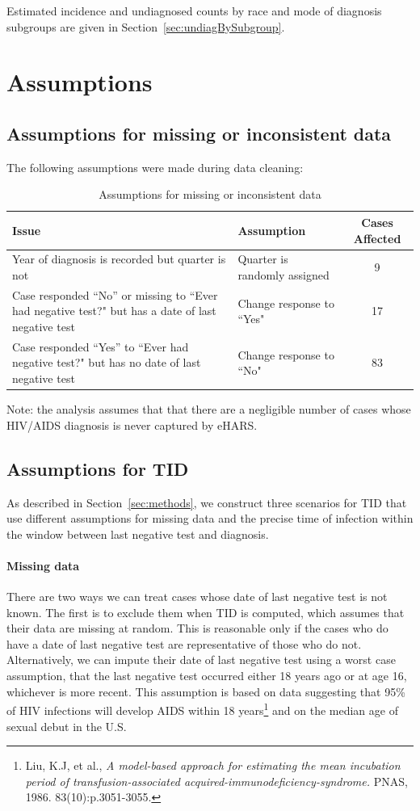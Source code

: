 \documentclass{article}\usepackage[]{graphicx}\usepackage[]{color}
\begin{document}
Estimated incidence and undiagnosed counts by race and mode of diagnosis subgroups are given in Section~\ref{sec:undiagBySubgroup}.

\appendix
\section{Assumptions}
\subsection{Assumptions for missing or inconsistent data}
\label{sec:missdata}
The following assumptions were made during data cleaning:
\begin{table}[h]
\centering
\caption{Assumptions for missing or inconsistent data}
\begin{tabular}{|p{8cm}|p{4cm}|c|}
  \hline
Issue & Assumption & Cases Affected \\
  \hline
Year of diagnosis is recorded but quarter is not & Quarter is randomly assigned & 9 \\
  \hline
Case responded ``No'' or missing to ``Ever had negative test?" but has a date of last negative test & Change response to ``Yes" & 17 \\
\hline
Case responded ``Yes'' to ``Ever had negative test?" but has no date of last negative test & Change response to ``No" & 83 \\
\hline
\end{tabular}
\label{tab:data_assumptions}
\end{table}

Note: the analysis assumes that that there are a negligible number of cases whose HIV/AIDS diagnosis is never captured by eHARS.

\subsection{Assumptions for TID}
\label{sec:imputemiss}

As described in Section~\ref{sec:methods}, we construct three scenarios for TID that use different assumptions for missing data and the precise time of infection within the window between last negative test and diagnosis. 

\paragraph{Missing data} There are two ways we can treat cases whose date of last negative test is not known. The first is to exclude them when TID is computed, which assumes that their data are missing at random. This is reasonable only if the cases who do have a date of last negative test are representative of those who do not. Alternatively, we can impute their date of last negative test using a worst case assumption, that the last negative test occurred either 18 years ago or at age 16, whichever is more recent. This assumption is based on data suggesting that 95\% of HIV infections will develop AIDS within 18 years\footnote{Liu, K.J, et al., \emph{A model-based approach for estimating the mean incubation period of transfusion-associated acquired-immunodeficiency-syndrome.} PNAS, 1986. 83(10):p.3051-3055.} and on the median age of sexual debut in the U.S. 
\end{document}
